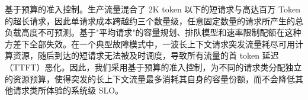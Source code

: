 基于预算的准入控制。生产流量混合了 2K token 以下的短请求与高达百万 Token 的超长请求，因此单请求成本跨越约三个数量级，任意固定数量的请求所产生的总负载高度不可预测。基于"平均请求"的容量规划、排队模型和速率限制配额在这种方差下全部失效。在一个典型故障模式中，一波长上下文请求突发流量耗尽可用计算资源，随后到达的短请求无法被及时调度，导致所有流量的首 token 延迟（TTFT）恶化。因此，我们采用基于预算的准入控制，为不同的请求类分配独立的资源预算，使得突发的长上下文流量最多消耗其自身的容量份额，而不会降低其他请求类所体验的系统级 SLO。

